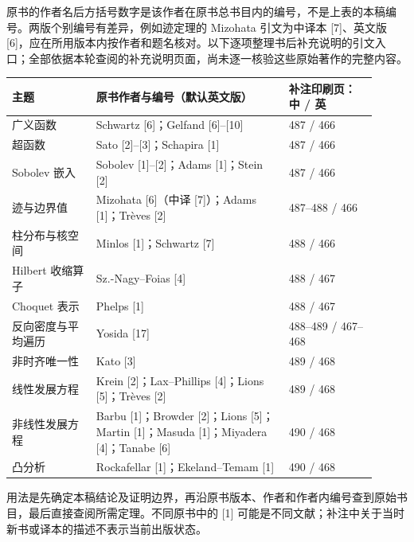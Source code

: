 原书的作者名后方括号数字是该作者在原书总书目内的编号，不是上表的本稿编号。两版个别编号有差异，例如迹定理的 Mizohata 引文为中译本 [7]、英文版 [6]，应在所用版本内按作者和题名核对。以下逐项整理书后补充说明的引文入口；全部依据本轮查阅的补充说明页面，尚未逐一核验这些原始著作的完整内容。
\begin{longtable}{p{0.21\linewidth}p{0.48\linewidth}p{0.22\linewidth}}
\toprule 主题 & 原书作者与编号（默认英文版） & 补注印刷页：中 / 英\\\midrule\endhead
广义函数 & Schwartz [6]；Gelfand [6]--[10] & 487 / 466\\
超函数 & Sato [2]--[3]；Schapira [1] & 487 / 466\\
Sobolev 嵌入 & Sobolev [1]--[2]；Adams [1]；Stein [2] & 487 / 466\\
迹与边界值 & Mizohata [6]（中译 [7]）；Adams [1]；Tr\`eves [2] & 487--488 / 466\\
柱分布与核空间 & Minlos [1]；Schwartz [7] & 488 / 466\\
Hilbert 收缩算子 & Sz.-Nagy--Foias [4] & 488 / 467\\
Choquet 表示 & Phelps [1] & 488 / 467\\
反向密度与平均遍历 & Yosida [17] & 488--489 / 467--468\\
非时齐唯一性 & Kato [3] & 489 / 468\\
线性发展方程 & Krein [2]；Lax--Phillips [4]；Lions [5]；Tr\`eves [2] & 489 / 468\\
非线性发展方程 & Barbu [1]；Browder [2]；Lions [5]；Martin [1]；Masuda [1]；Miyadera [4]；Tanabe [6] & 490 / 468\\
凸分析 & Rockafellar [1]；Ekeland--Temam [1] & 490 / 468\\
\bottomrule\end{longtable}
用法是先确定本稿结论及证明边界，再沿原书版本、作者和作者内编号查到原始书目，最后直接查阅所需定理。不同原书中的 [1] 可能是不同文献；补注中关于当时新书或译本的描述不表示当前出版状态。
